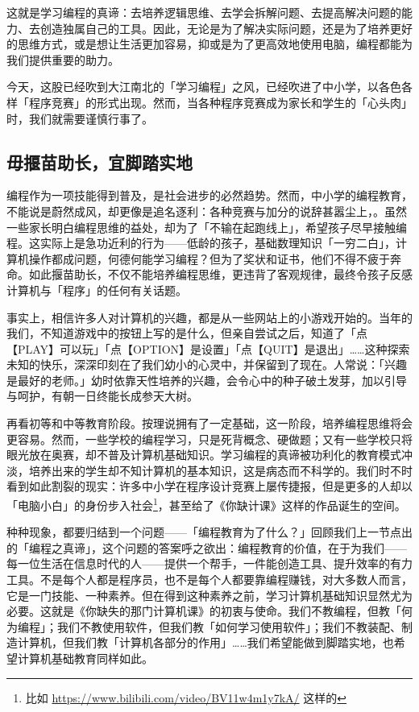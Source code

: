 这就是学习编程的真谛：去培养逻辑思维、去学会拆解问题、去提高解决问题的能力、去创造独属自己的工具。因此，无论是为了解决实际问题，还是为了培养更好的思维方式，或是想让生活更加容易，抑或是为了更高效地使用电脑，编程都能为我们提供重要的助力。

今天，这股已经吹到大江南北的「学习编程」之风，已经吹进了中小学，以各色各样「程序竞赛」的形式出现。然而，当各种程序竞赛成为家长和学生的「心头肉」时，我们就需要谨慎行事了。

\subsection{毋揠苗助长，宜脚踏实地}

编程作为一项技能得到普及，是社会进步的必然趋势。然而，中小学的编程教育，不能说是蔚然成风，却更像是追名逐利：各种竞赛与加分的说辞甚嚣尘上，。虽然一些家长明白编程思维的益处，却为了「不输在起跑线上」，希望孩子尽早接触编程。这实际上是急功近利的行为——低龄的孩子，基础数理知识「一穷二白」，计算机操作都成问题，何德何能学习编程？但为了奖状和证书，他们不得不疲于奔命。如此揠苗助长，不仅不能培养编程思维，更违背了客观规律，最终令孩子反感计算机与「程序」的任何有关话题。

事实上，相信许多人对计算机的兴趣，都是从一些网站上的小游戏开始的。当年的我们，不知道游戏中的按钮上写的是什么，但亲自尝试之后，知道了「点【PLAY】可以玩」「点【OPTION】是设置」「点【QUIT】是退出」……这种探索未知的快乐，深深印刻在了我们幼小的心灵中，并保留到了现在。人常说：「兴趣是最好的老师。」幼时依靠天性培养的兴趣，会令心中的种子破土发芽，加以引导与呵护，有朝一日终能长成参天大树。

再看初等和中等教育阶段。按理说拥有了一定基础，这一阶段，培养编程思维将会更容易。然而，一些学校的编程学习，只是死背概念、硬做题；又有一些学校只将眼光放在奥赛，却不普及计算机基础知识。学习编程的真谛被功利化的教育模式冲淡，培养出来的学生却不知计算机的基本知识，这是病态而不科学的。我们时不时看到如此割裂的现实：许多中小学在程序设计竞赛上屡传捷报，但是更多的人却以「电脑小白」的身份步入社会\footnote{比如 \url{https://www.bilibili.com/video/BV11w4m1y7kA/} 这样的}，甚至给了《你缺计课》这样的作品诞生的空间。

种种现象，都要归结到一个问题——「编程教育为了什么？」回顾我们上一节点出的「编程之真谛」，这个问题的答案呼之欲出：编程教育的价值，在于为我们——每一位生活在信息时代的人——提供一个帮手，一件能创造工具、提升效率的有力工具。不是每个人都是程序员，也不是每个人都要靠编程赚钱，对大多数人而言，它是一门技能、一种素养。但在得到这种素养之前，学习计算机基础知识显然尤为必要。这就是《你缺失的那门计算机课》的初衷与使命。我们不教编程，但教「何为编程」；我们不教使用软件，但我们教「如何学习使用软件」；我们不教装配、制造计算机，但我们教「计算机各部分的作用」……我们希望能做到脚踏实地，也希望计算机基础教育同样如此。

